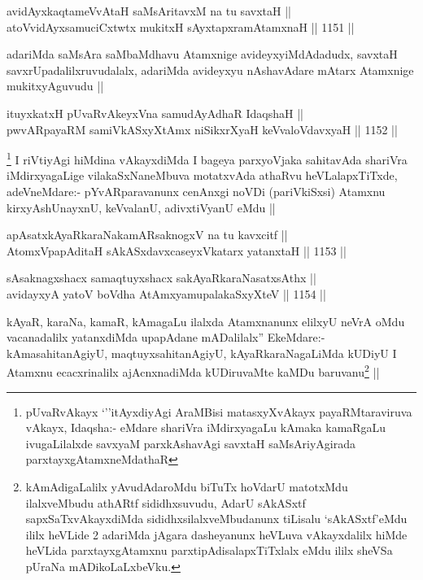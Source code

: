 \begin{shl}
avidAyxkaqtameVvAtaH saMsAritavxM na tu savxtaH || \\
atoV\s vidAyxsamuciCxtwtx mukitxH sAyxtapxramAtamxnaH ||  1151 ||  
\end{shl}

\begin{artha}
adariMda saMsAra saMbaMdhavu Atamxnige avideyxyiMdAdadudx, savxtaH savxrUpadalilxruvudalalx, adariMda avideyxyu nAshavAdare mAtarx Atamxnige mukitxyAguvudu ||
\end{artha}

\begin{shl}
ituyxkatxH pUvaRvAkeyxVna samudAyAdhaR IdaqshaH || \\
pwvARpayaRM samiVkASxyX\s \s tAmx niSikxrXyaH keVvaloV\s davxyaH ||  1152 ||  
\end{shl}

\begin{artha}
\footnote{pUvaRvAkayx `\stext''itAyxdiyAgi AraMBisi matasxyXvAkayx payaRMtaraviruva vAkayx, Idaqsha:- eMdare shariVra iMdirxyagaLu kAmaka kamaRgaLu ivugaLilalxde savxyaM parxkAshavAgi savxtaH saMsAriyAgirada parxtayxgAtamxneMdathaR}
I riVtiyAgi hiMdina vAkayxdiMda I bageya parxyoVjaka sahitavAda shariVra iMdirxyagaLige vilakaSxNaneMbuva motatxvAda athaRvu heVLalapxTiTxde, adeVneMdare:-
pYvARparavanunx cenAnxgi noVDi (pariVkiSxsi) Atamxnu kirxyAshUnayxnU, keVvalanU, adivxtiVyanU eMdu ||
\end{artha}


\begin{shl}
apAsatxkAyaRkaraNakamARsaknogxV na tu kavxcitf || \\
AtomxVpapAditaH sAkASxdavxcaseyxVkatarx yatanxtaH ||  1153 ||  
\end{shl}
				
\begin{shl}
sAsaknagxshacx samaqtuyxshacx sakAyaRkaraNasatxsAthx || \\
avidayxyA yatoV boVdha AtAmx\s yamupalakaSxyXteV ||  1154 ||  
\end{shl}

\begin{artha}
kAyaR, karaNa, kamaR, kAmagaLu ilalxda Atamxnanunx elilxyU neVrA oMdu vacanadalilx yatanxdiMda upapAdane mADalilalx'' EkeMdare:- kAmasahitanAgiyU, maqtuyxsahitanAgiyU, kAyaRkaraNagaLiMda kUDiyU I Atamxnu ecacxrinalilx ajAcnxnadiMda kUDiruvaMte kaMDu baruvanu\footnote{kAmAdigaLalilx yAvudAdaroMdu biTuTx hoVdarU matotxMdu ilalxveMbudu athARtf sididhxsuvudu, AdarU sAkASxtf sapxSaTxvAkayxdiMda sididhxsilalxveMbudanunx tiLisalu `sAkASxtf'eMdu ililx heVLide 2 adariMda jAgara dasheyanunx heVLuva vAkayxdalilx hiMde heVLida parxtayxgAtamxnu parxtipAdisalapxTiTxlalx eMdu ililx sheVSa pUraNa mADikoLaLxbeVku.} ||
\end{artha}


